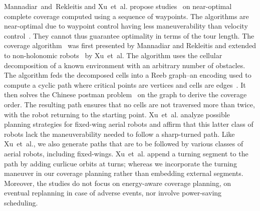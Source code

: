 Mannadiar~and~Rekleitis and Xu~et~al. propose studies~\citep{mannadiar2010optimal,xu2011optimal,xu2014efficient} on near-optimal complete coverage computed using a sequence of waypoints. The algorithms are near-optimal due to waypoint control having less maneuverability than velocity control~\citep{xu2014efficient}. They cannot thus guarantee optimality in terms of the tour length. The coverage algorithm~\citep{mannadiar2010optimal} was first presented by Mannadiar and Rekleitis and extended to non-holonomic robots~\citep{xu2011optimal,xu2014efficient} by Xu~et~al. The algorithm uses the cellular decomposition of a known environment with an arbitrary number of obstacles. The algorithm feds the decomposed cells into a Reeb graph--an encoding used to compute a cyclic path where critical points are vertices and cells are edges~\citep{fomenko1997topological}. It then solves the Chinese postman problem~\citep{eiselt2000historical} on the graph to derive the coverage order. The resulting path ensures that no cells are not traversed more than twice, with the robot returning to the starting point. Xu~et~al. analyze possible planning strategies for fixed-wing aerial robots and affirm that this latter class of robots lack the maneuverability needed to follow a sharp-turned path. Like Xu~et~al., we also generate paths that are to be followed by various classes of aerial robots, including fixed-wings. Xu~et~al. append a turning segment to the path by adding curlicue orbits at turns; whereas we incorporate the turning maneuver in our coverage planning rather than embedding external segments. Moreover, the studies do not focus on energy-aware coverage planning, on eventual replanning in case of adverse events, nor involve power-saving scheduling.

